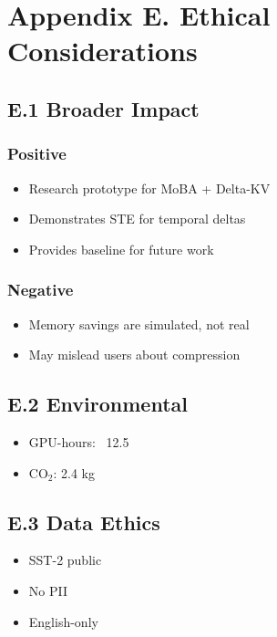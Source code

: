 \section{Appendix E. Ethical Considerations}

\subsection{E.1 Broader Impact}

\subsubsection{Positive}
\begin{itemize}
\item Research prototype for MoBA + Delta-KV
\item Demonstrates STE for temporal deltas
\item Provides baseline for future work

\end{itemize}
\subsubsection{Negative}
\begin{itemize}
\item Memory savings are simulated, not real
\item May mislead users about compression

\end{itemize}
\subsection{E.2 Environmental}

\begin{itemize}
\item GPU-hours: ~12.5
\item CO$_2$: 2.4 kg

\end{itemize}
\subsection{E.3 Data Ethics}

\begin{itemize}
\item SST-2 public
\item No PII
\item English-only

\end{itemize}
